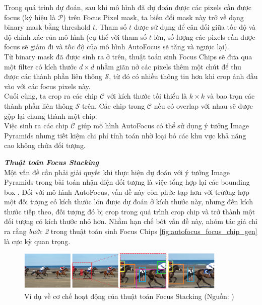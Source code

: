 {    \noindent
    Trong quá trình dự đoán, sau khi mô hình đã dự đoán được các pixels  cần được focus (ký hiệu là $\mathcal{P}$) trên Focus Pixel  mask, ta biến đổi mask này trở về dạng binary mask bằng threshold $t$.
    Tham số $t$ được sử dụng để cân đối giữa tốc độ và độ chính xác của mô hình (cụ thể với tham số $t$ lớn, số lượng các pixels  cần được focus sẽ giảm đi và tốc độ của mô hình AutoFocus sẽ tăng và ngược lại). \\
    Từ binary mask đã được sinh ra ở trên, thuật toán sinh Focus Chips sẽ đưa qua một filter có kích thước $d \times d$ nhằm giãn nở các pixels  thêm một chút để thu được các thành phần liên thông $\mathcal{S}$, từ đó có nhiều thông tin hơn khi crop ảnh đầu vào với các focus pixels  này. \\
    Cuối cùng, ta crop ra các chip $\mathcal{C}$ với kích thước tối thiểu là $k \times k$ và bao trọn các thành phần liên thông $\mathcal{S}$ trên.
    Các chip trong $\mathcal{C}$ nếu có overlap với nhau sẽ được gộp lại chung thành một chip. \\
    Việc sinh ra các chip $\mathcal{C}$ giúp mô hình AutoFocus có thể sử dụng ý tưởng Image Pyramids nhưng tiết kiệm chi phí tính toán nhờ loại bỏ các khu vực khả năng cao không chứa đối tượng.

    \noindent
    \textbf{\textit{Thuật toán Focus Stacking}} \\
    Một vấn đề cần phải giải quyết khi thực hiện dự đoán với ý tưởng Image Pyramids trong bài toán nhận diện đối tượng  là việc tổng hợp lại các bounding box .
    Đối với mô hình AutoFocus, vấn đề này còn phức tạp hơn với trường hợp một đối tượng có kích thước lớn được dự đoán ở kích thước này, nhưng đến kích thước tiếp theo, đối tượng đó bị crop trong quá trình crop chip và trở thành một đối tượng có kích thước nhỏ hơn.
    Nhằm hạn chế bớt vấn đề này, nhóm tác giả chỉ ra rằng \textit{bước 2} trong thuật toán sinh Focus Chips \ref{fig:autofocus_focus_chip_gen} là cực kỳ quan trọng.

    \begin{figure}[H]
        \centering
        \includegraphics[width=10cm] {images/autofocus_focus_stack}
        \caption{Ví dụ về cơ chế hoạt động của thuật toán Focus Stacking (Nguồn: \cite{najibi2019autofocus})}
        \label{fig:autofocus_focus_stack}
    \end{figure}

}
